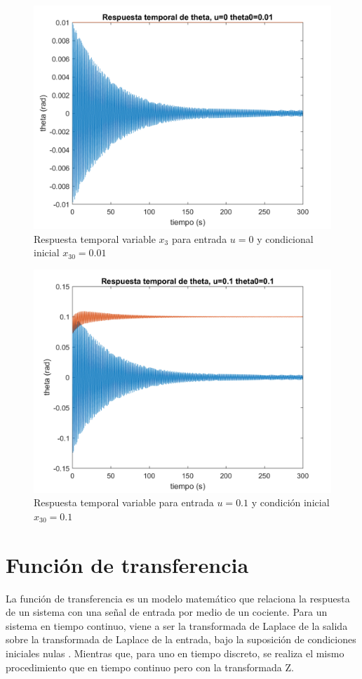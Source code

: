 \documentclass[journal]{IEEEtran}
\begin{document}
\begin{figure}[h!]
\caption{Respuesta temporal variable $x_3$ para entrada $u=0$ y condicional inicial $x_{30}=0.01$\label{fig:t0.01}}
  \centering
\includegraphics[scale=0.19]{Graficaslvsnl/t0_01.png}
\end{figure}
       
\begin{figure}[h!]
\caption{Respuesta temporal variable para entrada $u=0.1$ y condición inicial $x_{30}=0.1$\label{fig:t0.1}}
  \centering
\includegraphics[scale=0.19]{Graficaslvsnl/t0_1.png}
\end{figure}

\section{Función de transferencia}
\label{sec:tf}
La función de transferencia es un modelo matemático que relaciona la respuesta de un sistema con una señal de entrada por medio de un cociente. Para un sistema en tiempo continuo, viene a ser la transformada de Laplace de la salida sobre la transformada de Laplace de la entrada, bajo la suposición de condiciones iniciales nulas \cite{wiki:state} . Mientras que, para uno en tiempo discreto, se realiza el mismo procedimiento que en tiempo continuo pero con la transformada Z.   
\end{document}
